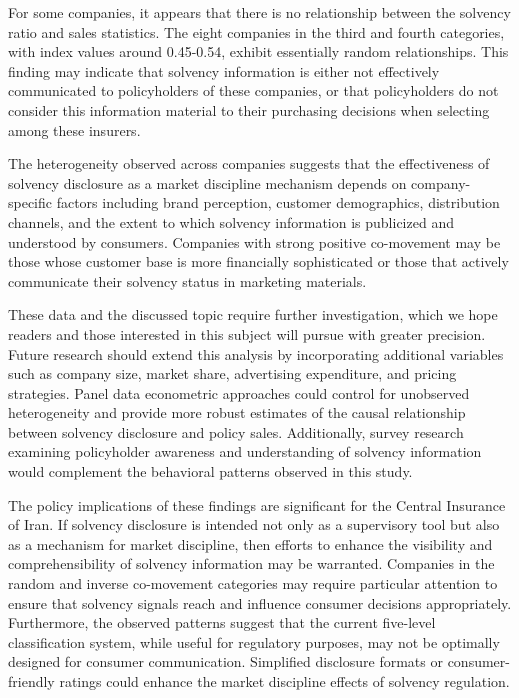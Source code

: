 \documentclass[twoside]{article}
\begin{document}
For some companies, it appears that there is no relationship between the solvency ratio and sales statistics. The eight companies in the third and fourth categories, with index values around 0.45-0.54, exhibit essentially random relationships. This finding may indicate that solvency information is either not effectively communicated to policyholders of these companies, or that policyholders do not consider this information material to their purchasing decisions when selecting among these insurers.

The heterogeneity observed across companies suggests that the effectiveness of solvency disclosure as a market discipline mechanism depends on company-specific factors including brand perception, customer demographics, distribution channels, and the extent to which solvency information is publicized and understood by consumers. Companies with strong positive co-movement may be those whose customer base is more financially sophisticated or those that actively communicate their solvency status in marketing materials.

These data and the discussed topic require further investigation, which we hope readers and those interested in this subject will pursue with greater precision. Future research should extend this analysis by incorporating additional variables such as company size, market share, advertising expenditure, and pricing strategies. Panel data econometric approaches could control for unobserved heterogeneity and provide more robust estimates of the causal relationship between solvency disclosure and policy sales. Additionally, survey research examining policyholder awareness and understanding of solvency information would complement the behavioral patterns observed in this study.

The policy implications of these findings are significant for the Central Insurance of Iran. If solvency disclosure is intended not only as a supervisory tool but also as a mechanism for market discipline, then efforts to enhance the visibility and comprehensibility of solvency information may be warranted. Companies in the random and inverse co-movement categories may require particular attention to ensure that solvency signals reach and influence consumer decisions appropriately. Furthermore, the observed patterns suggest that the current five-level classification system, while useful for regulatory purposes, may not be optimally designed for consumer communication. Simplified disclosure formats or consumer-friendly ratings could enhance the market discipline effects of solvency regulation.
\end{document}
